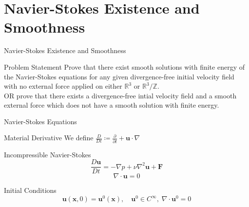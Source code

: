 \documentclass[handout]{beamer}
\newcommand{\Real}{\mathbb{R}}
\newcommand{\Integer}{\mathbb{Z}}
\begin{document}
  \section{Navier-Stokes Existence and Smoothness}
  \begin{frame}{Navier-Stokes Existence and Smoothness}
      \begin{block}{Problem Statement}
          Prove that there exist smooth solutions with finite energy of the
          Navier-Stokes equations for any given divergence-free initial
          velocity field with no external force applied on either $\Real^3$
          or $\Real^3/\Integer$.\pause\\
          OR prove that there exists a divergence-free
          intial velocity field and a smooth external force which does not
          have a smooth solution with finite energy.
      \end{block}
  \end{frame}
  \begin{frame}{Navier-Stokes Equations}
      \pause
      \begin{block}{Material Derivative}
          We define $\frac{D}{Dt} \coloneqq \frac{\partial}{\partial t} +
          \mathbf{u} \cdot \nabla$
      \end{block}
      \pause
      \begin{block}{Incompressible Navier-Stokes}
          $$
          \frac{D \mathbf{u}}{D t} = -\nabla p + \nu\nabla^2\mathbf{u} +
          \mathbf{F}
          $$\pause
          $$
          \nabla \cdot \mathbf{u} = 0
          $$
      \end{block}
      \pause
      \begin{block}{Initial Conditions}
          $$
          \mathbf{u}(\mathbf{x}, 0) = \mathbf{u}^0(\mathbf{x}), \quad
          \mathbf{u}^0 \in C^{\infty},\; \nabla \cdot \mathbf{u}^0 = 0
          $$
      \end{block}
  \end{frame}
\end{document}
